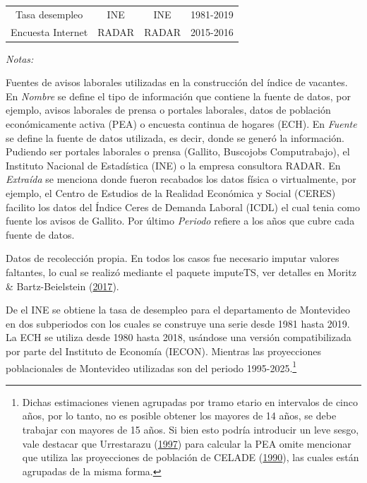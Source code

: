 \documentclass[12pt,oneside]{reedthesis}
\begin{document}
\begin{table}[!h]
\begin{threeparttable}
\begin{tabular}[t]{cccc}
Tasa desempleo & INE & INE & 1981-2019\\
Encuesta Internet & RADAR & RADAR & 2015-2016\\
\bottomrule
\end{tabular}
\begin{tablenotes}
\item \textit{Notas:} 
\item \footnotesize Fuentes de avisos laborales utilizadas en la construcción del índice de vacantes. En \textit{Nombre} se define el tipo de información que contiene la fuente de datos, por ejemplo, avisos laborales de prensa o portales laborales, datos de población económicamente activa (PEA) o encuesta continua de hogares (ECH). En \textit{Fuente} se define la fuente de datos utilizada, es decir, donde se generó la información. Pudiendo ser portales laborales o prensa (Gallito, Buscojobs Computrabajo), el Instituto Nacional de Estadística (INE) o la empresa consultora RADAR. En \textit{Extraída} se menciona donde fueron recabados los datos física o virtualmente, por ejemplo, el Centro de Estudios de la Realidad Económica y Social (CERES) facilito los datos del Índice Ceres de Demanda Laboral (ICDL) el cual tenia como fuente los avisos de Gallito. Por último \textit{Periodo} refiere a los años que cubre cada fuente de datos.
\item[1] Datos de recolección propia. En todos los casos fue necesario imputar valores faltantes, lo cual se realizó mediante el paquete imputeTS, ver detalles en Moritz \& Bartz-Beielstein (\protect\hyperlink{ref-Moritz2017}{2017}).
\end{tablenotes}
\end{threeparttable}
\end{table}




De el INE se obtiene la tasa de desempleo para el departamento de Montevideo en dos subperiodos con los cuales se construye una serie desde 1981 hasta 2019. La ECH se utiliza desde 1980 hasta 2018, usándose una versión compatibilizada por parte del Instituto de Economía (IECON). Mientras las proyecciones poblacionales de Montevideo utilizadas son del periodo 1995-2025.\footnote{Dichas estimaciones vienen agrupadas por tramo etario en intervalos de cinco años, por lo tanto, no es posible obtener los mayores de 14 años, se debe trabajar con mayores de 15 años. Si bien esto podría introducir un leve sesgo, vale destacar que Urrestarazu (\protect\hyperlink{ref-Urrestarazu1997}{1997}) para calcular la PEA omite mencionar que utiliza las proyecciones de población de CELADE (\protect\hyperlink{ref-Celade1990}{1990}), las cuales están agrupadas de la misma forma.}
\end{document}
